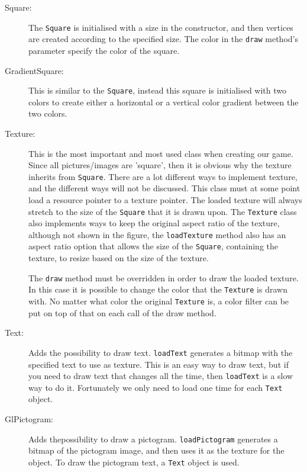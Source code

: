 \begin{description}
\item[Square:] The \lstinline|Square| is initialised with a size in the constructor, and then vertices are created according to the specified size. The color in the \lstinline|draw| method's parameter specify the color of the square.

\item[GradientSquare:] This is similar to the \lstinline|Square|, instead this square is initialised with two colors to create either a horizontal or a vertical color gradient between the two colors.

\item[Texture:] This is the most important and most used class when creating our game. Since all pictures/images are 'square', then it is obvious why the texture inherits from \lstinline|Square|. There are a lot different ways to implement texture, and the different ways will not be discussed. This class must at some point load a resource pointer to a texture pointer. The loaded texture will always stretch to the size of the \lstinline|Square| that it is drawn upon. The \lstinline|Texture| class also implements ways to keep the original aspect ratio of the texture, although not shown in the figure, the \lstinline|loadTexture| method also has an aspect ratio option that allows the size of the \lstinline|Square|, containing the texture, to resize based on the size of the texture.

The \lstinline|draw| method must be overridden in order to draw the loaded texture. In this case it is possible to change the color that the \lstinline|Texture| is drawn with. No matter what color the original \lstinline|Texture| is, a color filter can be put on top of that on each call of the draw method.

\item[Text:] Adds the possibility to draw text. \lstinline|loadText| generates a bitmap with the specified text to use as texture. This is an easy way to draw text, but if you need to draw text that changes all the time, then \lstinline|loadText| is a slow way to do it. Fortunately we only need to load one time for each \lstinline|Text| object.

\item[GlPictogram:] Adds thepossibility to draw a pictogram. \lstinline|loadPictogram| generates a bitmap of the pictogram image, and then uses it as the texture for the object. To draw the pictogram text, a \lstinline|Text| object is used.
\end{description}

